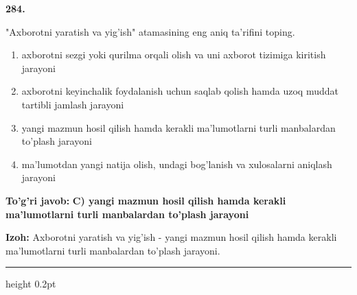 \documentclass[10pt,a4paper,oneside]{article}
\begin{document}
\noindent\textbf{\color{ink}284.}
\par
"Axborotni yaratish va yig'ish" atamasining eng aniq ta'rifini toping.
\begin{enumerate}[label=\Alph*),leftmargin=9mm]
\item axborotni sezgi yoki qurilma orqali olish va uni axborot tizimiga kiritish jarayoni
\item axborotni keyinchalik foydalanish uchun saqlab qolish hamda uzoq muddat tartibli jamlash jarayoni
\item yangi mazmun hosil qilish hamda kerakli ma'lumotlarni turli manbalardan to'plash jarayoni
\item ma'lumotdan yangi natija olish, undagi bog'lanish va xulosalarni aniqlash jarayoni
\end{enumerate}
\begin{tcolorbox}[enhanced,breakable,colback=teal!4,colframe=teal!50!black,boxrule=0.5pt,arc=1.1mm,left=3mm,right=3mm,top=1.7mm,bottom=1.7mm,before skip=2mm,after skip=2mm]
\textbf{\color{teal}To'g'ri javob:} \textbf{C) yangi mazmun hosil qilish hamda kerakli ma'lumotlarni turli manbalardan to'plash jarayoni}
\par\smallskip
\textbf{Izoh:} Axborotni yaratish va yig'ish - yangi mazmun hosil qilish hamda kerakli ma'lumotlarni turli manbalardan to'plash jarayoni.
\end{tcolorbox}
\vspace{2mm}\hrule height 0.2pt \vspace{3mm}
\end{document}
